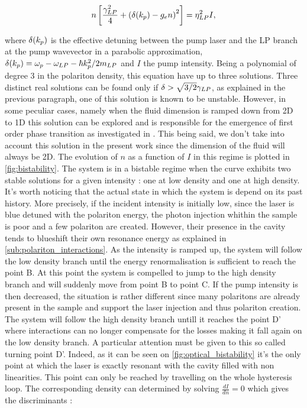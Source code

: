 \begin{equation}
    n \left[ \dfrac{\gamma_{LP}^2}{4} + \left(\delta(k_p) - g_{e} n \right)^2 \right] =  \eta_{LP}^2 I,
\label{eq:eq_of_state}
\end{equation}

where $\delta(k_p)$ is the effective detuning between the pump laser and the LP branch at the pump wavevector in a parabolic approximation, $\delta(k_p) = \omega_p - \omega_{LP}-{\hbar k_p^2}/2m_{LP}$ and $I$ the pump intensity. Being a polynomial of degree 3 in the polariton density, this equation have up to three solutions.
Three distinct real solutions can be found only if $\delta>\sqrt{3/2}\gamma_{LP}$, as explained in the previous paragraph, one of this solution is known to be unstable. However, in some peculiar cases, namely when the fluid dimension is ramped down from 2D to 1D this solution can be explored and is responsible for the emergence of first order phase transition as investigated in \cite{li_dissipative_2022}.
This being said, we don't take into account this solution in the present work since the dimension of the fluid will always be 2D.
The evolution of $n$ as a function of $I$ in this regime is plotted in \autoref{fig:bistability}. The system is in a bistable regime when the curve exhibits two stable solutions for a given intensity : one at low density and one at high density.
It's worth noticing that the actual state in which the system is depend on its past history. More precisely, if the incident intensity is initially low, since the laser is blue detuned with the polariton energy, the photon injection whithin the sample is poor and a few polariton are created. However, their presence in the cavity tends to blueshift their own resonance energy as explained in \autoref{sub:polariton_interactions}. As the intensity is ramped up, the system will follow the low density branch until the energy renormalisation is sufficient to reach the point B. At this point the system is compelled to jump to the high density branch and will suddenly move from point B to point C.
If the pump intensity is then decreased, the situation is rather different since many polaritons are already present in the sample and support the laser injection and thus polariton creation. The system will follow the high density branch untill it reaches the point D' where interactions can no longer compensate for the losses making it fall again on the low density branch. A particular attention must be given to this so called turning point D'. Indeed, as it can be seen on \autoref{fig:optical_bistability} it's the only point at which the laser is exactly resonant with the cavity filled with non linearities.
This point can only be reached by travelling on the whole hysteresis loop. The corresponding density can determined by solving $\frac{dI}{dn}=0$ which gives the discriminants :

